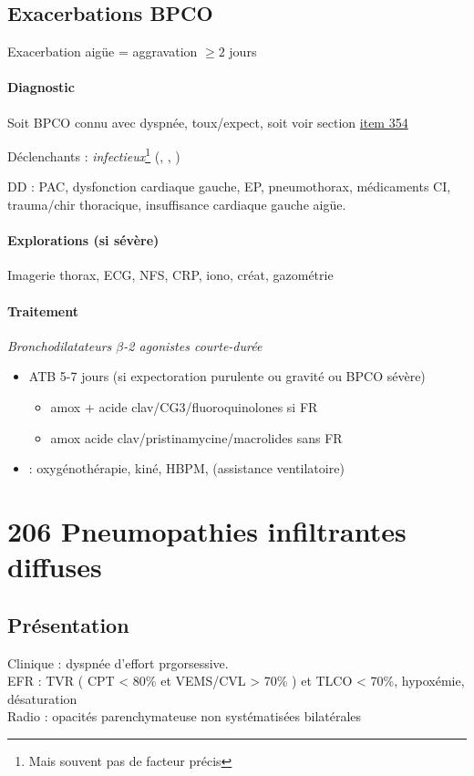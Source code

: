 \documentclass{book}
\begin{document}
\subsection{Exacerbations BPCO}
\label{sec:org2a3d811}
Exacerbation aigüe = aggravation \(\ge 2\) jours
\paragraph{Diagnostic}
\label{sec:org8402200}
Soit BPCO connu avec \inc dyspnée, toux/expect, soit voir section \hyperref[org0000afb]{item 354}

Déclenchants : \emph{infectieux}\footnote{Mais souvent pas de facteur précis} 
(, , )

DD : PAC, dysfonction cardiaque gauche, EP, pneumothorax, médicaments CI, trauma/chir thoracique, insuffisance cardiaque gauche aigüe.

\paragraph{Explorations (si sévère)}
\label{sec:org44068f0}
Imagerie thorax, ECG, NFS, CRP, iono, créat, gazométrie

\paragraph{Traitement}
\label{sec:orgc374feb}
\emph{Bronchodilatateurs \(\beta\)-2 agonistes courte-durée} 
\begin{itemize}
\item \textpm{} ATB 5-7 jours (si expectoration
purulente ou gravité ou BPCO sévère) 
\begin{itemize}
\item amox + acide clav/CG3/fluoroquinolones si FR
\item amox \textpm{} acide clav/pristinamycine/macrolides sans FR
\end{itemize}
\item \faHospitalO : oxygénothérapie, kiné, HBPM, (assistance ventilatoire)
\end{itemize}

\section{206 \textdagger{} Pneumopathies infiltrantes diffuses}
\label{sec:org6bdff3c}
\subsection{Présentation}
\label{sec:org49f4681}
Clinique : dyspnée d'effort prgorsessive.\\
EFR : \gls{TVR} ( CPT < 80\% et VEMS/CVL >
70\% ) et TLCO < 70\%, hypoxémie, désaturation\\
Radio : opacités parenchymateuse non systématisées bilatérales
\end{document}
